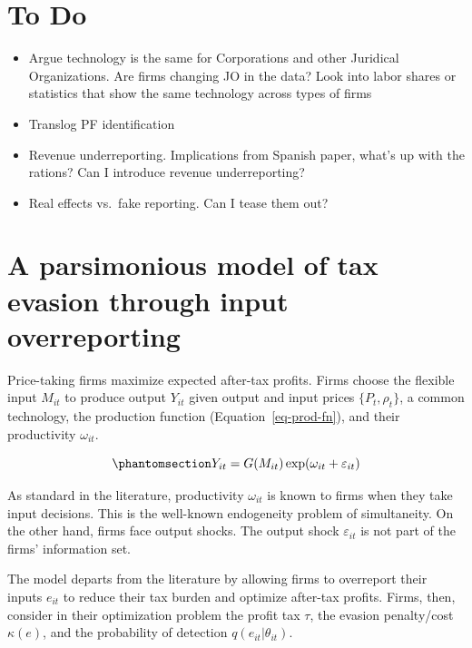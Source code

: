 \documentclass[
  12pt]{article}
\providecommand{\tightlist}{%
  \setlength{\itemsep}{0pt}\setlength{\parskip}{0pt}}\usepackage{longtable,booktabs,array}
\theoremstyle{definition}
\theoremstyle{remark}
\begin{document}
\section*{To Do}\label{to-do}

\begin{itemize}
\tightlist
\item
  Argue technology is the same for Corporations and other Juridical
  Organizations. Are firms changing JO in the data? Look into labor
  shares or statistics that show the same technology across types of
  firms
\item
  Translog PF identification
\item
  Revenue underreporting. Implications from Spanish paper, what's up
  with the rations? Can I introduce revenue underreporting?
\item
  Real effects vs.~fake reporting. Can I tease them out?
\end{itemize}

\section{A parsimonious model of tax evasion through input
overreporting}\label{a-parsimonious-model-of-tax-evasion-through-input-overreporting}

Price-taking firms maximize expected after-tax profits. Firms choose the
flexible input \(M_{it}\) to produce output \(Y_{it}\) given output and
input prices \(\{P_{t}, \rho_t\}\), a common technology, the production
function (Equation~\ref{eq-prod-fn}), and their productivity
\(\omega_{it}\).

\begin{equation}\phantomsection\label{eq-prod-fn}{
Y_{it}=G(M_{it})\exp(\omega_{it}+\varepsilon_{it})
}\end{equation}

As standard in the literature, productivity \(\omega_{it}\) is known to
firms when they take input decisions. This is the well-known endogeneity
problem of simultaneity. On the other hand, firms face output shocks.
The output shock \(\varepsilon_{it}\) is not part of the firms'
information set.

The model departs from the literature by allowing firms to overreport
their inputs \(e_{it}\) to reduce their tax burden and optimize
after-tax profits. Firms, then, consider in their optimization problem
the profit tax \(\tau\), the evasion penalty/cost \(\kappa(e)\), and the
probability of detection \(q(e_{it}|\theta_{it})\).
\end{document}

